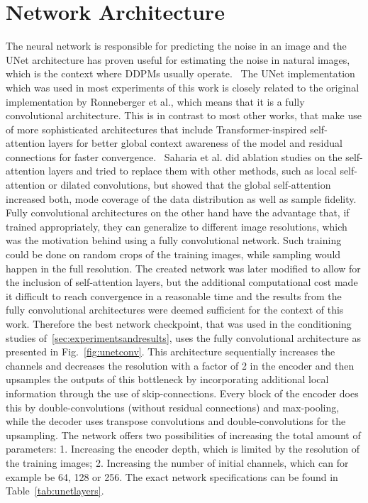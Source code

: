 \section{Network Architecture}
\label{sec:networkarch}
The neural network is responsible for predicting the noise in an image and the UNet architecture has proven useful for estimating the noise in natural images, which is the context where DDPMs usually operate.~\autocite{ronneberger2015unet,ho2020denoising} The UNet implementation which was used in most experiments of this work is closely related to the original implementation by Ronneberger et al., which means that it is a fully convolutional architecture. This is in contrast to most other works, that make use of more sophisticated architectures that include Transformer-inspired self-attention layers for better global context awareness of the model and residual connections for faster convergence.~\autocite{vaswani2017attention,he2015deep} Saharia et al. did ablation studies on the self-attention layers and tried to replace them with other methods, such as local self-attention or dilated convolutions, but showed that the global self-attention increased both, mode coverage of the data distribution as well as sample fidelity.~\autocite{saharia2022palette} Fully convolutional architectures on the other hand have the advantage that, if trained appropriately, they can generalize to different image resolutions, which was the motivation behind using a fully convolutional network. Such training could be done on random crops of the training images, while sampling would happen in the full resolution. The created network was later modified to allow for the inclusion of self-attention layers, but the additional computational cost made it difficult to reach convergence in a reasonable time and the results from the fully convolutional architectures were deemed sufficient for the context of this work. Therefore the best network checkpoint, that was used in the conditioning studies of~\ref{sec:experimentsandresults}, uses the fully convolutional architecture as presented in Fig.~\ref{fig:unetconv}. This architecture sequentially increases the channels and decreases the resolution with a factor of 2 in the encoder and then upsamples the outputs of this bottleneck by incorporating additional local information through the use of skip-connections. Every block of the encoder does this by double-convolutions (without residual connections) and max-pooling, while the decoder uses transpose convolutions and double-convolutions for the upsampling. The network offers two possibilities of increasing the total amount of parameters: 1. Increasing the encoder depth, which is limited by the resolution of the training images; 2. Increasing the number of initial channels, which can for example be 64, 128 or 256. The exact network specifications can be found in Table~\ref{tab:unetlayers}.

